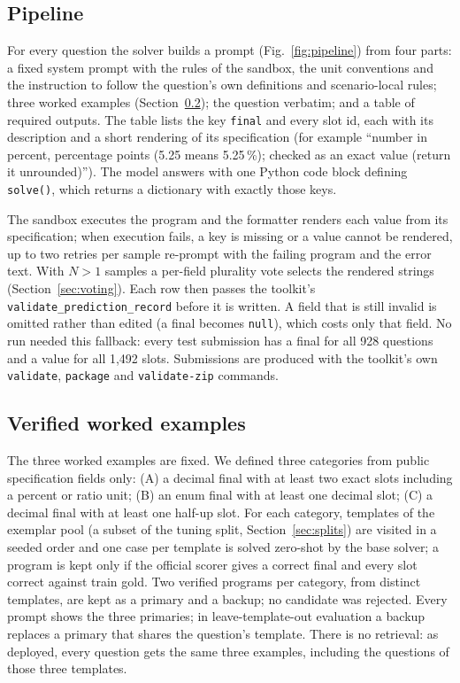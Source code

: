 \documentclass[conference]{IEEEtran}
\newcommand{\id}[1]{\texttt{#1}}
\begin{document}
\subsection{Pipeline}
For every question the solver builds a prompt (Fig.~\ref{fig:pipeline}) from four parts: a fixed system prompt with the rules of the sandbox, the unit conventions and the instruction to follow the question's own definitions and scenario-local rules; three worked examples (Section~\ref{sec:exemplars}); the question verbatim; and a table of required outputs. The table lists the key \id{final} and every slot id, each with its description and a short rendering of its specification (for example ``number in percent, percentage points (5.25 means 5.25\,\%); checked as an exact value (return it unrounded)''). The model answers with one Python code block defining \id{solve()}, which returns a dictionary with exactly those keys.

The sandbox executes the program and the formatter renders each value from its specification; when execution fails, a key is missing or a value cannot be rendered, up to two retries per sample re-prompt with the failing program and the error text. With $N>1$ samples a per-field plurality vote selects the rendered strings (Section~\ref{sec:voting}). Each row then passes the toolkit's \id{validate\_prediction\_record} before it is written. A field that is still invalid is omitted rather than edited (a final becomes \id{null}), which costs only that field. No run needed this fallback: every test submission has a final for all 928 questions and a value for all 1,492 slots. Submissions are produced with the toolkit's own \id{validate}, \id{package} and \id{validate-zip} commands.

\subsection{Verified worked examples}\label{sec:exemplars}
The three worked examples are fixed. We defined three categories from public specification fields only: (A) a decimal final with at least two exact slots including a percent or ratio unit; (B) an enum final with at least one decimal slot; (C) a decimal final with at least one half-up slot. For each category, templates of the exemplar pool (a subset of the tuning split, Section~\ref{sec:splits}) are visited in a seeded order and one case per template is solved zero-shot by the base solver; a program is kept only if the official scorer gives a correct final and every slot correct against train gold. Two verified programs per category, from distinct templates, are kept as a primary and a backup; no candidate was rejected. Every prompt shows the three primaries; in leave-template-out evaluation a backup replaces a primary that shares the question's template. There is no retrieval: as deployed, every question gets the same three examples, including the questions of those three templates.
\end{document}
